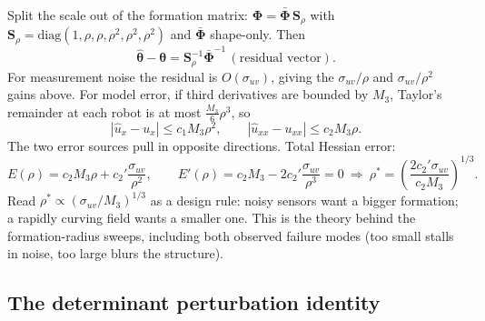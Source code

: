 \documentclass[11pt]{article}
\begin{document}
Split the scale out of the formation matrix:
$\boldsymbol{\Phi} = \bar{\boldsymbol{\Phi}}\,\mathbf{S}_\rho$ with
$\mathbf{S}_\rho = \mathrm{diag}(1, \rho, \rho, \rho^2, \rho^2, \rho^2)$
and $\bar{\boldsymbol{\Phi}}$ shape-only. Then
\begin{equation}
\hat{\boldsymbol{\theta}} - \boldsymbol{\theta}
= \mathbf{S}_\rho^{-1}\bar{\boldsymbol{\Phi}}^{-1}\,(\text{residual vector}).
\end{equation}
For measurement noise the residual is $O(\sigma_{uv})$, giving the
$\sigma_{uv}/\rho$ and $\sigma_{uv}/\rho^2$ gains above. For model error,
if third derivatives are bounded by $M_3$, Taylor's remainder at each robot
is at most $\tfrac{M_3}{6}\rho^3$, so
\begin{equation}
|\hat{u}_x - u_x| \leq c_1 M_3 \rho^2, \qquad
|\hat{u}_{xx} - u_{xx}| \leq c_2 M_3 \rho .
\end{equation}
The two error sources pull in opposite directions. Total Hessian error:
\begin{equation}
E(\rho) = c_2 M_3 \rho + c_2' \frac{\sigma_{uv}}{\rho^2},
\qquad
E'(\rho) = c_2 M_3 - 2c_2'\frac{\sigma_{uv}}{\rho^3} = 0
\ \Longrightarrow\
\rho^* = \left(\frac{2c_2'\sigma_{uv}}{c_2 M_3}\right)^{1/3}.
\end{equation}
Read $\rho^* \propto (\sigma_{uv}/M_3)^{1/3}$ as a design rule: noisy
sensors want a bigger formation; a rapidly curving field wants a smaller
one. This is the theory behind the formation-radius sweeps, including both
observed failure modes (too small stalls in noise, too large blurs the
structure).

\subsection{The determinant perturbation identity}
\end{document}
